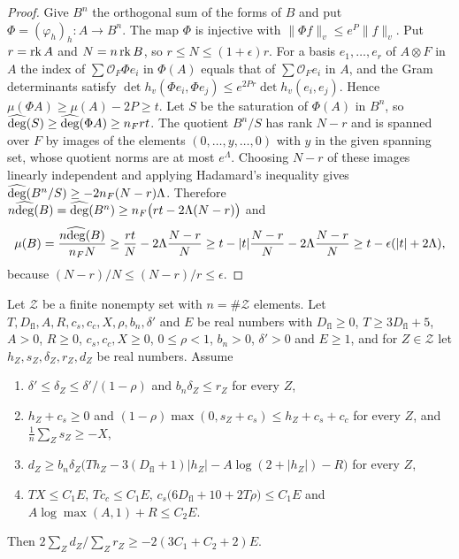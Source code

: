 \begin{proof}
Give $B^n$ the orthogonal sum of the forms of $B$ and put $\Phi=(\varphi_h)_h\colon A\to B^n$. The map $\Phi$ is injective with $\lVert\Phi f\rVert_v\le e^P\lVert f\rVert_v$. Put $r=\operatorname{rk} A$ and $N=n\operatorname{rk} B$, so $r\le N\le(1+\epsilon)r$. For a basis $e_1,\dots,e_r$ of $A\otimes F$ in $A$ the index of $\sum\mathcal O_F\Phi e_i$ in $\Phi(A)$ equals that of $\sum\mathcal O_Fe_i$ in $A$, and the Gram determinants satisfy $\det h_v(\Phi e_i,\Phi e_j)\le e^{2Pr}\det h_v(e_i,e_j)$. Hence $\mu(\Phi A)\ge\mu(A)-2P\ge t$. Let $S$ be the saturation of $\Phi(A)$ in $B^n$, so $\widehat{\deg}(S)\ge\widehat{\deg}(\Phi A)\ge n_Frt$. The quotient $B^n/S$ has rank $N-r$ and is spanned over $F$ by images of the elements $(0,\dots,y,\dots,0)$ with $y$ in the given spanning set, whose quotient norms are at most $e^\Lambda$. Choosing $N-r$ of these images linearly independent and applying Hadamard's inequality gives $\widehat{\deg}(B^n/S)\ge-2n_F(N-r)\Lambda$. Therefore $n\widehat{\deg}(B)=\widehat{\deg}(B^n)\ge n_F\big(rt-2\Lambda(N-r)\big)$ and
\[
\mu(B)=\frac{n\widehat{\deg}(B)}{n_FN}\ge\frac{rt}N-2\Lambda\frac{N-r}N\ge t-\lvert t\rvert\frac{N-r}N-2\Lambda\frac{N-r}N\ge t-\epsilon(\lvert t\rvert+2\Lambda),
\]
because $(N-r)/N\le(N-r)/r\le\epsilon$.
\end{proof}

\begin{lemma}\label{cov:mean}
Let $\mathcal Z$ be a finite nonempty set with $n=\#\mathcal Z$ elements. Let $T,D_{\mathrm{fl}},A,R,c_s,c_c,X,\rho,b_n,\delta'$ and $E$ be real numbers with $D_{\mathrm{fl}}\ge0$, $T\ge3D_{\mathrm{fl}}+5$, $A>0$, $R\ge0$, $c_s,c_c,X\ge0$, $0\le\rho<1$, $b_n>0$, $\delta'>0$ and $E\ge1$, and for $Z\in\mathcal Z$ let $h_Z,s_Z,\delta_Z,r_Z,d_Z$ be real numbers. Assume
\begin{enumerate}
\item[(a)] $\delta'\le\delta_Z\le\delta'/(1-\rho)$ and $b_n\delta_Z\le r_Z$ for every $Z$,
\item[(b)] $h_Z+c_s\ge0$ and $(1-\rho)\max(0,s_Z+c_s)\le h_Z+c_s+c_c$ for every $Z$, and $\frac1n\sum_Zs_Z\ge-X$,
\item[(c)] $d_Z\ge b_n\delta_Z\big(Th_Z-3(D_{\mathrm{fl}}+1)\lvert h_Z\rvert-A\log(2+\lvert h_Z\rvert)-R\big)$ for every $Z$,
\item[(d)] $TX\le C_1E$, $Tc_c\le C_1E$, $c_s\big(6D_{\mathrm{fl}}+10+2T\rho\big)\le C_1E$ and $A\log\max(A,1)+R\le C_2E$.
\end{enumerate}
Then $2\sum_Zd_Z/\sum_Zr_Z\ge-2(3C_1+C_2+2)E$.
\end{lemma}

